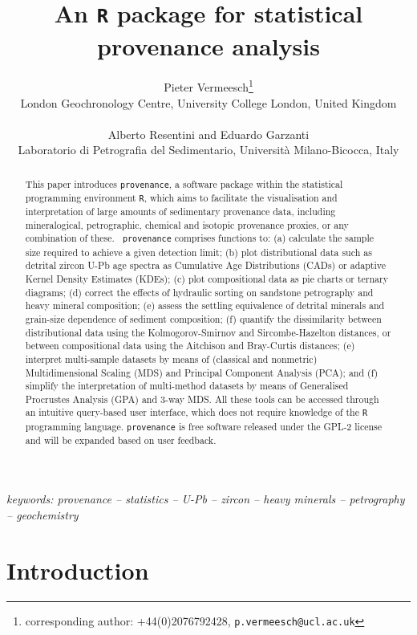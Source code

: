\documentclass{article}
\title{An {\tt R} package for statistical provenance analysis}
\author{Pieter Vermeesch\footnote{
corresponding author: +44(0)2076792428, 
{\tt p.vermeesch@ucl.ac.uk}}\\ 
London Geochronology Centre, University College London, United Kingdom\\~\\
Alberto Resentini and Eduardo Garzanti\\
Laboratorio di Petrografia del Sedimentario, 
Universit\`{a} Milano-Bicocca, Italy}
\begin{document}
\maketitle

\begin{abstract}
This paper introduces {\tt provenance}, a software package within the
statistical programming environment {\tt R}, which aims to facilitate
the visualisation and interpretation of large amounts of sedimentary
provenance data, including mineralogical, petrographic, chemical and
isotopic provenance proxies, or any combination of these. {\tt
  provenance} comprises functions to: (a) calculate the sample size
required to achieve a given detection limit; (b) plot distributional
data such as detrital zircon U-Pb age spectra as Cumulative Age
Distributions (CADs) or adaptive Kernel Density Estimates (KDEs); (c)
plot compositional data as pie charts or ternary diagrams; (d) correct
the effects of hydraulic sorting on sandstone petrography and heavy
mineral composition; (e) assess the settling equivalence of detrital
minerals and grain-size dependence of sediment composition; (f)
quantify the dissimilarity between distributional data using the
Kolmogorov-Smirnov and Sircombe-Hazelton distances, or between
compositional data using the Aitchison and Bray-Curtis distances; (e)
interpret multi-sample datasets by means of (classical and nonmetric)
Multidimensional Scaling (MDS) and Principal Component Analysis (PCA);
and (f) simplify the interpretation of multi-method datasets by means
of Generalised Procrustes Analysis (GPA) and 3-way MDS. All these
tools can be accessed through an intuitive query-based user interface,
which does not require knowledge of the {\tt R} programming
language. {\tt provenance} is free software released under the GPL-2
license and will be expanded based on user feedback.
\end{abstract}

\begin{center}
\emph{keywords: provenance -- statistics -- U-Pb -- zircon -- heavy
  minerals -- petrography -- geochemistry}
\end{center}

\section{Introduction}
\label{sec:intro}
\end{document}
